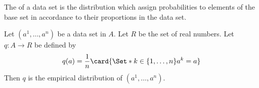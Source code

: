 
\sbasic





















\sstart
{}



The 
of a data set is the distribution
which assign probabilities to
elements of the base set in accordance
to their proportions in the
data set.


Let $(a^1, \dots, a^n)$ be a data set in $A$.
Let $R$ be the set of real numbers.
Let $q: A \to R$ be defined by
\[
  q(a) = \frac{1}{n} \card{\Set*{k \in \set{1, \dots, n}}{a^k = a}}
\]
Then $q$ is the empirical distribution
of $(a^1, \dots, a^n)$.
\strats
